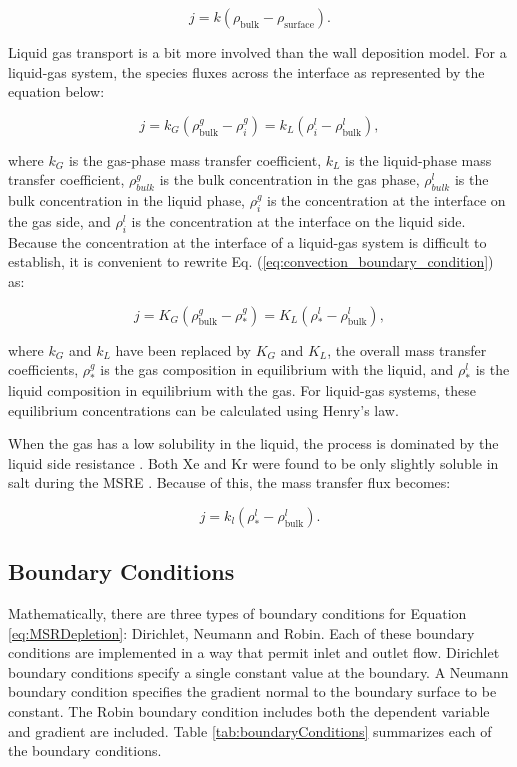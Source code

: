 \begin{equation}
    j = k(\rho_{\text{bulk}} - \rho_{\text{surface}}).
\end{equation}

Liquid gas transport is a bit more involved than the wall deposition model. For a liquid-gas system, the species fluxes across the interface as represented by the equation below:

 \begin{equation}
	j = k_{G}(\rho^{g}_{\text{bulk}} - \rho^{g}_{i}) = k_{L}(\rho^{l}_{i} - \rho^{l}_{\text{bulk}})
	\label{eq:convection_boundary_condition},
\end{equation}

\noindent where $k_{G}$ is the gas-phase mass transfer coefficient, $k_{L}$ is the liquid-phase mass transfer coefficient, $\rho^{g}_{bulk}$ is the bulk concentration in the gas phase, $\rho^{l}_{bulk}$ is the bulk concentration in the liquid phase, $\rho^{g}_{i}$ is the concentration at the interface on the gas side, and $\rho^{l}_{i}$ is the concentration at the interface on the liquid side. Because the concentration at the interface of a liquid-gas system is difficult to establish, it is convenient to rewrite Eq. (\ref{eq:convection_boundary_condition}) as:

 \begin{equation}
	j = K_{G}(\rho^{g}_{\text{bulk}} - \rho^{g}_{*}) = K_{L}(\rho^{l}_{*} - \rho^{l}_{\text{bulk}})
	\label{eq:overall_convection_boundary_condition},
\end{equation}

\noindent where $k_{G}$ and $k_{L}$ have been replaced by $K_{G}$ and $K_{L}$, the overall mass transfer coefficients, $\rho^{g}_{*}$ is the gas composition in equilibrium with the liquid, and $\rho^{l}_{*}$ is the liquid composition in equilibrium with the gas. For liquid-gas systems, these equilibrium concentrations can be calculated using Henry's law. 

When the gas has a low solubility in the liquid, the process is dominated by the liquid side resistance \cite{bird2006}. Both Xe and Kr were found to be only slightly soluble in salt during the MSRE \cite{kedl1972}. Because of this, the mass transfer flux becomes:

\begin{equation}
    j = k_{l}(\rho^{l}_{*} - \rho^{l}_{\text{bulk}}).
\end{equation}

\subsection{Boundary Conditions}
Mathematically, there are three types of boundary conditions for Equation \ref{eq:MSRDepletion}: Dirichlet, Neumann and Robin. Each of these boundary conditions are implemented in a way that permit inlet and outlet flow. Dirichlet boundary conditions specify a single constant value at the boundary. A Neumann boundary condition specifies the gradient normal to the boundary surface to be constant. The Robin boundary condition includes both the dependent variable and gradient are included. Table \ref{tab:boundaryConditions} summarizes each of the boundary conditions.

